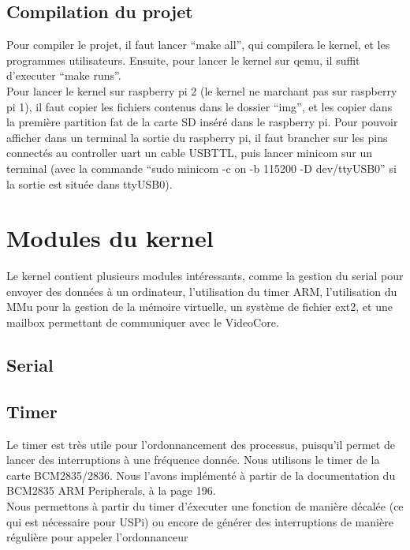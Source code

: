 \documentclass[a4paper]{article}
\begin{document}
\subsection{Compilation du projet}

Pour compiler le projet, il faut lancer ``make all'', qui compilera le kernel,
et les programmes utilisateurs. Ensuite, pour lancer le kernel sur qemu, il
suffit d'executer ``make runs''.\\

Pour lancer le kernel sur raspberry pi 2 (le
kernel ne marchant pas sur raspberry pi 1), il faut copier les fichiers contenus
dans le dossier ``img'', et les copier dans la première partition fat de la
carte SD inséré dans le raspberry pi. Pour pouvoir afficher dans un terminal la
sortie du raspberry pi, il faut brancher sur les pins connectés au controller
uart un cable USBTTL, puis lancer minicom sur un terminal (avec la commande
``sudo minicom -c on -b 115200 -D dev/ttyUSB0'' si la sortie est située dans
ttyUSB0).


\section{Modules du kernel}

Le kernel contient plusieurs modules intéressants, comme la gestion du serial
pour envoyer des données à un ordinateur, l'utilisation du timer ARM,
l'utilisation du MMu pour la gestion de la mémoire virtuelle, un système de
fichier ext2, et une mailbox permettant de communiquer avec le VideoCore.

\subsection{Serial}
\subsection{Timer}

Le timer est très utile pour l'ordonnancement des processus, puisqu'il permet de
lancer des interruptions à une fréquence donnée. Nous utilisons le timer de la
carte BCM2835/2836. Nous l'avons implémenté à partir de la documentation du
BCM2835 ARM Peripherals, à la page 196.\\

Nous permettons à partir du timer d'éxecuter une fonction de manière décalée (ce
qui est nécessaire pour USPi) ou encore de générer des interruptions de manière
régulière pour appeler l'ordonnanceur
\end{document}
